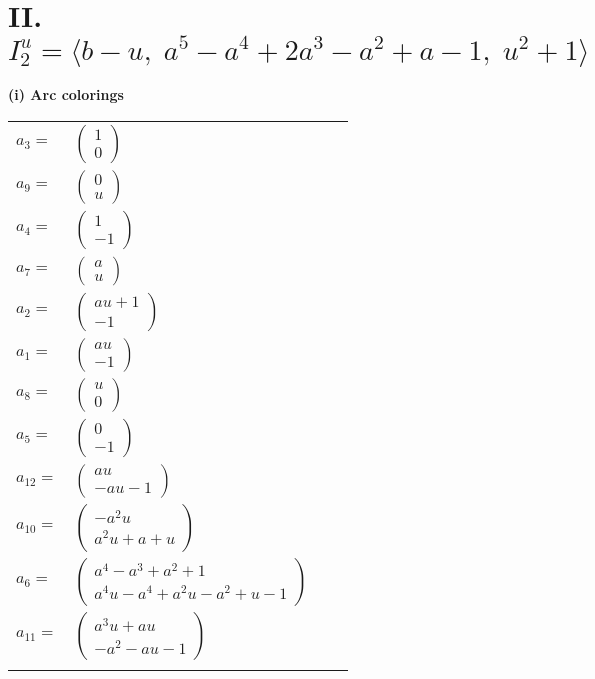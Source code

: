 \documentclass[1p]{elsarticle_modified}
\theoremstyle{definition}
\begin{document}
\centering \section*{II. $I^u_{2}= \langle b- u,\;a^5- a^4+2 a^3- a^2+a-1,\;u^2+1 \rangle$}
\flushleft \textbf{(i) Arc colorings}\\
\begin{tabular}{m{7pt} m{180pt} m{7pt} m{180pt} }
\flushright $a_{3}=$&$\begin{pmatrix}1\\0\end{pmatrix}$ \\
\flushright $a_{9}=$&$\begin{pmatrix}0\\u\end{pmatrix}$ \\
\flushright $a_{4}=$&$\begin{pmatrix}1\\-1\end{pmatrix}$ \\
\flushright $a_{7}=$&$\begin{pmatrix}a\\u\end{pmatrix}$ \\
\flushright $a_{2}=$&$\begin{pmatrix}a u+1\\-1\end{pmatrix}$ \\
\flushright $a_{1}=$&$\begin{pmatrix}a u\\-1\end{pmatrix}$ \\
\flushright $a_{8}=$&$\begin{pmatrix}u\\0\end{pmatrix}$ \\
\flushright $a_{5}=$&$\begin{pmatrix}0\\-1\end{pmatrix}$ \\
\flushright $a_{12}=$&$\begin{pmatrix}a u\\- a u-1\end{pmatrix}$ \\
\flushright $a_{10}=$&$\begin{pmatrix}- a^2 u\\a^2 u+a+u\end{pmatrix}$ \\
\flushright $a_{6}=$&$\begin{pmatrix}a^4- a^3+a^2+1\\a^4 u- a^4+a^2 u- a^2+u-1\end{pmatrix}$ \\
\flushright $a_{11}=$&$\begin{pmatrix}a^3 u+a u\\- a^2- a u-1\end{pmatrix}$\\&\end{tabular}
\end{document}
